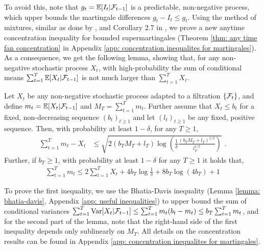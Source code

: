 To avoid this, note that $g_t = \mathbb{E}[I_t|\mathcal{F}_{t-1}]$ is a predictable, non-negative process, which upper bounds the martingale differences $g_t - I_t \leq g_t$. Using the method of mixtures, similar as done by \cite{Abbasi-YadkoriImprovedAlgorithmsLinear2011}, and Corollary 2.7 in \citep{FanExponentialinequalitiesmartingales2015}, we prove a new anytime concentration inequality for bounded supermartingales (Theorem \ref{thm: any time fan concentration} in Appendix \ref{app: concentration inequalites for martingales}). As a consequence, we get the following lemma, showing that, for any non-negative stochastic process $X_t$, with high-probability the sum of conditional means $\sum_{t=1}^T \mathbb{E}[X_t|\mathcal{F}_{t-1}]$ is not much larger than $\sum_{t=1}^T X_t$.
\begin{lemma}\label{lemma: concentration of conditinal means} Let $X_t$ be any non-negative stochastic process adapted to a filtration $\{\mathcal{F}_t\}$, and define $m_t = \mathbb{E}[X_t|\mathcal{F}_{t-1}]$ and $M_T = \sum_{t=1}^T m_t$. Further assume that $X_t \leq b_t$ for a fixed, non-decreasing sequence $(b_t)_{t \geq 1}$ and let $(l_t)_{t\geq 1}$ be any fixed, positive sequence. Then, with probability at least $1-\delta$, for any $T \geq 1$,
	\begin{align*}
	\sum_{t=1}^T m_t - X_t &\leq \sqrt{2(b_T M_T + l_T) \log\left(\frac{1}{\delta} \frac{(b_T M_T + l_T)^{1/2}}{l_T^{1/2}}\right)} \text{ .}
	\end{align*}
	Further, if $b_T \geq 1$, with probability at least $1-\delta$ for any $T \geq 1$ it holds that,
	\begin{align*}
	\sum_{t=1}^T m_t \leq 2\sum_{t=1}^T X_t + 4 b_T \log\frac{1}{\delta} + 8  b_T\log(4 b_T) + 1
	\end{align*}
\end{lemma}
To prove the first inequality, we use the Bhatia-Davis inequality (Lemma \ref{lemma: bhatia-davis}, Appendix \ref{app: useful inequalities}) to upper bound the sum of conditional variances $\sum_{t=1}^T \operatorname*{Var}[X_t|\mathcal{F}_{t-1}] \leq \sum_{t=1}^T m_t(b_t-m_t) \leq b_T \sum_{t=1}^T m_t$, and for the second part of the lemma, note that the right-hand side of the first inequality depends only sublinearly on $M_T$. All details on the concentration results can be found in Appendix \ref{app: concentration inequalites for martingales}.

